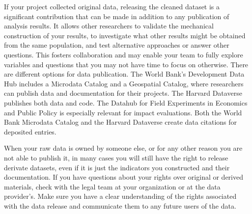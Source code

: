 If your project collected original data,
releasing the cleaned dataset is a significant contribution that can be made
in addition to any publication of analysis results.
It allows other researchers to validate the mechanical construction of your results,
to investigate what other results might be obtained from the same population,
and test alternative approaches or answer other questions.
This fosters collaboration and may enable your team to fully explore variables and
questions that you may not have time to focus on otherwise.
There are different options for data publication.
The World Bank's Development Data Hub
includes a Microdata Catalog
and a Geospatial Catalog,
where researchers can publish data and documentation for their projects.
The Harvard Dataverse
publishes both data and code. 
The Datahub for Field Experiments in Economics and Public Policy 
is especially relevant for impact evaluations. 
Both the World Bank Microdata Catalog and the Harvard Dataverse
create data citations for deposited entries.

When your raw data is owned by someone else,
or for any other reason you are not able to publish it,
in many cases you will still have the right to release derivate datasets,
even if it is just the indicators you constructed and their documentation.
If you have questions about your rights over original or derived materials,
check with the legal team at your organization or at the data provider's.
Make sure you have a clear understanding of the rights associated with the data release
and communicate them to any future users of the data.

